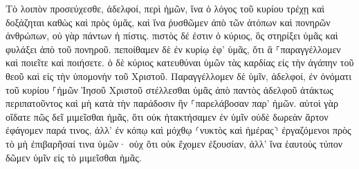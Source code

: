 \documentclass{openreader}
\begin{document}
Τὸ λοιπὸν προσεύχεσθε, ἀδελφοί, περὶ ἡμῶν, ἵνα ὁ λόγος τοῦ κυρίου τρέχῃ καὶ δοξάζηται καθὼς καὶ πρὸς ὑμᾶς, 
καὶ ἵνα ῥυσθῶμεν ἀπὸ τῶν ἀτόπων καὶ πονηρῶν ἀνθρώπων, οὐ γὰρ πάντων ἡ πίστις. 
πιστὸς δέ ἐστιν ὁ κύριος, ὃς στηρίξει ὑμᾶς καὶ φυλάξει ἀπὸ τοῦ πονηροῦ. 
πεποίθαμεν δὲ ἐν κυρίῳ ἐφ’ ὑμᾶς, ὅτι ἃ ⸀παραγγέλλομεν καὶ ποιεῖτε καὶ ποιήσετε. 
ὁ δὲ κύριος κατευθύναι ὑμῶν τὰς καρδίας εἰς τὴν ἀγάπην τοῦ θεοῦ καὶ εἰς τὴν ὑπομονὴν τοῦ Χριστοῦ. 
Παραγγέλλομεν δὲ ὑμῖν, ἀδελφοί, ἐν ὀνόματι τοῦ κυρίου ⸀ἡμῶν Ἰησοῦ Χριστοῦ στέλλεσθαι ὑμᾶς ἀπὸ παντὸς ἀδελφοῦ ἀτάκτως περιπατοῦντος καὶ μὴ κατὰ τὴν παράδοσιν ἣν ⸀παρελάβοσαν παρ’ ἡμῶν. 
αὐτοὶ γὰρ οἴδατε πῶς δεῖ μιμεῖσθαι ἡμᾶς, ὅτι οὐκ ἠτακτήσαμεν ἐν ὑμῖν 
οὐδὲ δωρεὰν ἄρτον ἐφάγομεν παρά τινος, ἀλλ’ ἐν κόπῳ καὶ μόχθῳ ⸂νυκτὸς καὶ ἡμέρας⸃ ἐργαζόμενοι πρὸς τὸ μὴ ἐπιβαρῆσαί τινα ὑμῶν· 
οὐχ ὅτι οὐκ ἔχομεν ἐξουσίαν, ἀλλ’ ἵνα ἑαυτοὺς τύπον δῶμεν ὑμῖν εἰς τὸ μιμεῖσθαι ἡμᾶς. 
\end{document}
